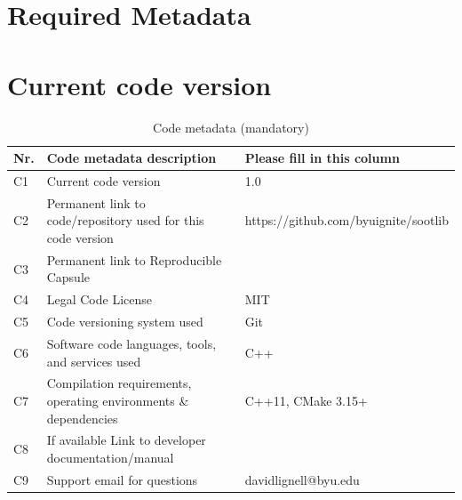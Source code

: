 \documentclass[preprint,letterpaper]{elsarticle}
\begin{document}

\section*{Required Metadata}

\section*{Current code version}

\begin{table}
\begin{tabular}{|l|p{6.5cm}|p{6.5cm}|}
\hline
\textbf{Nr.} & \textbf{Code metadata description} & \textbf{Please fill in this column} \\
\hline
C1 & Current code version & 1.0 \\
\hline
C2 & Permanent link to code/repository used for this code version & https://github.com/byuignite/sootlib \\
\hline
C3  & Permanent link to Reproducible Capsule & \\
\hline
C4 & Legal Code License & MIT \\
\hline
C5 & Code versioning system used & Git \\
\hline
C6 & Software code languages, tools, and services used & C++ \\
\hline
C7 & Compilation requirements, operating environments \& dependencies & C++11, CMake 3.15+\\
\hline
C8 & If available Link to developer documentation/manual &  \\
\hline
C9 & Support email for questions & davidlignell@byu.edu \\
\hline
\end{tabular}
\caption{Code metadata (mandatory)}
\end{table}

\end{document}
